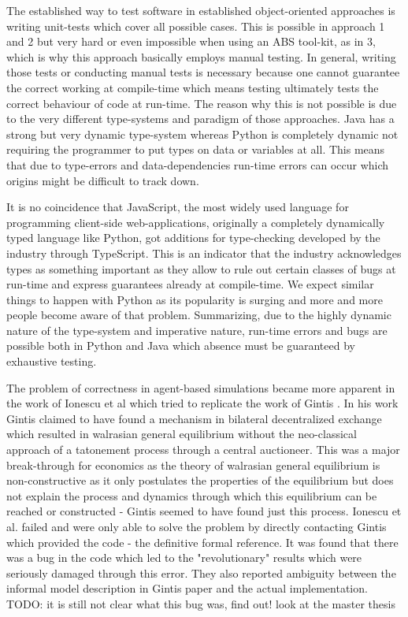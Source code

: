 The established way to test software in established object-oriented approaches is writing unit-tests which cover all possible cases. This is possible in approach 1 and 2 but very hard or even impossible when using an ABS tool-kit, as in 3, which is why this approach basically employs manual testing. In general, writing those tests or conducting manual tests is necessary because one cannot guarantee the correct working at compile-time which means testing ultimately tests the correct behaviour of code at run-time. The reason why this is not possible is due to the very different type-systems and paradigm of those approaches. Java has a strong but very dynamic type-system whereas Python is completely dynamic not requiring the programmer to put types on data or variables at all. This means that due to type-errors and data-dependencies run-time errors can occur which origins might be difficult to track down.

It is no coincidence that JavaScript, the most widely used language for programming client-side web-applications, originally a completely dynamically typed language like Python, got additions for type-checking developed by the industry through TypeScript. This is an indicator that the industry acknowledges types as something important as they allow to rule out certain classes of bugs at run-time and express guarantees already at compile-time. We expect similar things to happen with Python as its popularity is surging and more and more people become aware of that problem. Summarizing, due to the highly dynamic nature of the type-system and imperative nature, run-time errors and bugs are possible both in Python and Java which absence must be guaranteed by exhaustive testing. 

The problem of correctness in agent-based simulations became more apparent in the work of Ionescu et al \cite{ionescu_dependently-typed_2012} which tried to replicate the work of Gintis \cite{gintis_emergence_2006}. In his work Gintis claimed to have found a mechanism in bilateral decentralized exchange which resulted in walrasian general equilibrium without the neo-classical approach of a tatonement process through a central auctioneer. This was a major break-through for economics as the theory of walrasian general equilibrium is non-constructive as it only postulates the properties of the equilibrium \cite{colell_microeconomic_1995} but does not explain the process and dynamics through which this equilibrium can be reached or constructed - Gintis seemed to have found just this process. Ionescu et al. \cite{ionescu_dependently-typed_2012} failed and were only able to solve the problem by directly contacting Gintis which provided the code - the definitive formal reference. It was found that there was a bug in the code which led to the "revolutionary" results which were seriously damaged through this error. They also reported ambiguity between the informal model description in Gintis paper and the actual implementation. TODO: it is still not clear what this bug was, find out! look at the master thesis 

